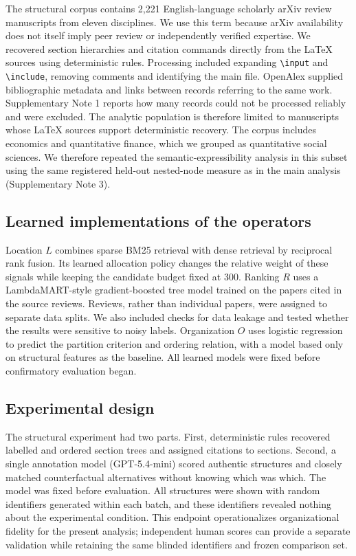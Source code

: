 \documentclass[11pt,a4paper]{article}
\begin{document}
The structural corpus contains 2,221 English-language scholarly arXiv review manuscripts from eleven disciplines. We use this term because arXiv availability does not itself imply peer review or independently verified expertise. We recovered section hierarchies and citation commands directly from the LaTeX sources using deterministic rules. Processing included expanding \texttt{\textbackslash input} and \texttt{\textbackslash include}, removing comments and identifying the main file. OpenAlex supplied bibliographic metadata and links between records referring to the same work\cite{openalex}. Supplementary Note 1 reports how many records could not be processed reliably and were excluded. The analytic population is therefore limited to manuscripts whose LaTeX sources support deterministic recovery. The corpus includes economics and quantitative finance, which we grouped as quantitative social sciences. We therefore repeated the semantic-expressibility analysis in this subset using the same registered held-out nested-node measure as in the main analysis (Supplementary Note 3).

\subsection*{Learned implementations of the operators}

Location $L$ combines sparse BM25 retrieval\cite{bm25} with dense retrieval by reciprocal rank fusion\cite{rrf}. Its learned allocation policy changes the relative weight of these signals while keeping the candidate budget fixed at 300. Ranking $R$ uses a LambdaMART-style gradient-boosted tree model\cite{lambdamart,lightgbm} trained on the papers cited in the source reviews. Reviews, rather than individual papers, were assigned to separate data splits. We also included checks for data leakage and tested whether the results were sensitive to noisy labels. Organization $O$ uses logistic regression to predict the partition criterion and ordering relation, with a model based only on structural features as the baseline. All learned models were fixed before confirmatory evaluation began.

\subsection*{Experimental design}

The structural experiment had two parts. First, deterministic rules recovered labelled and ordered section trees and assigned citations to sections. Second, a single annotation model (GPT-5.4-mini) scored authentic structures and closely matched counterfactual alternatives without knowing which was which. The model was fixed before evaluation. All structures were shown with random identifiers generated within each batch, and these identifiers revealed nothing about the experimental condition. This endpoint operationalizes organizational fidelity for the present analysis; independent human scores can provide a separate validation while retaining the same blinded identifiers and frozen comparison set.
\end{document}
